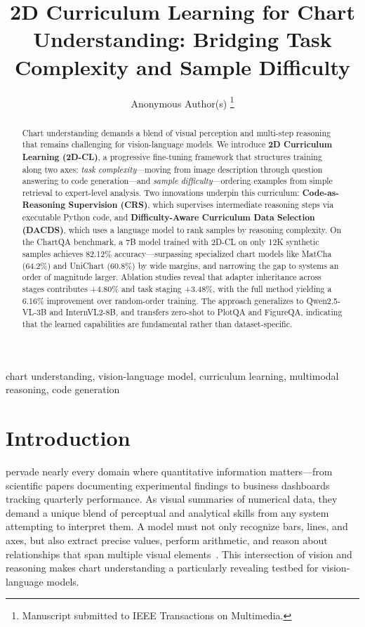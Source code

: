 \documentclass[journal]{IEEEtran}
\newcommand{\method}{2D-CL}
\newcommand{\fullmethod}{2D Curriculum Learning}
\newcommand{\crs}{CRS}
\newcommand{\dacds}{DACDS}
\begin{document}
\title{2D Curriculum Learning for Chart Understanding: Bridging Task Complexity and Sample Difficulty}

\author{Anonymous Author(s)%
\thanks{Manuscript submitted to IEEE Transactions on Multimedia.}}

\maketitle

\begin{abstract}
Chart understanding demands a blend of visual perception and multi-step reasoning that remains challenging for vision-language models.
We introduce \textbf{\fullmethod{} (\method{})}, a progressive fine-tuning framework that structures training along two axes: \textit{task complexity}---moving from image description through question answering to code generation---and \textit{sample difficulty}---ordering examples from simple retrieval to expert-level analysis.
Two innovations underpin this curriculum: \textbf{Code-as-Reasoning Supervision (\crs{})}, which supervises intermediate reasoning steps via executable Python code, and \textbf{Difficulty-Aware Curriculum Data Selection (\dacds{})}, which uses a language model to rank samples by reasoning complexity.
On the ChartQA benchmark, a 7B model trained with \method{} on only 12K synthetic samples achieves 82.12\% accuracy---surpassing specialized chart models like MatCha (64.2\%) and UniChart (60.8\%) by wide margins, and narrowing the gap to systems an order of magnitude larger.
Ablation studies reveal that adapter inheritance across stages contributes +4.80\% and task staging +3.48\%, with the full method yielding a 6.16\% improvement over random-order training.
The approach generalizes to Qwen2.5-VL-3B and InternVL2-8B, and transfers zero-shot to PlotQA and FigureQA, indicating that the learned capabilities are fundamental rather than dataset-specific.
\end{abstract}

\begin{IEEEkeywords}
chart understanding, vision-language model, curriculum learning, multimodal reasoning, code generation
\end{IEEEkeywords}

\section{Introduction}
 pervade nearly every domain where quantitative information matters---from scientific papers documenting experimental findings to business dashboards tracking quarterly performance. As visual summaries of numerical data, they demand a unique blend of perceptual and analytical skills from any system attempting to interpret them. A model must not only recognize bars, lines, and axes, but also extract precise values, perform arithmetic, and reason about relationships that span multiple visual elements~\cite{masry2022chartqa,methani2020plotqa}. This intersection of vision and reasoning makes chart understanding a particularly revealing testbed for vision-language models.
\end{document}
